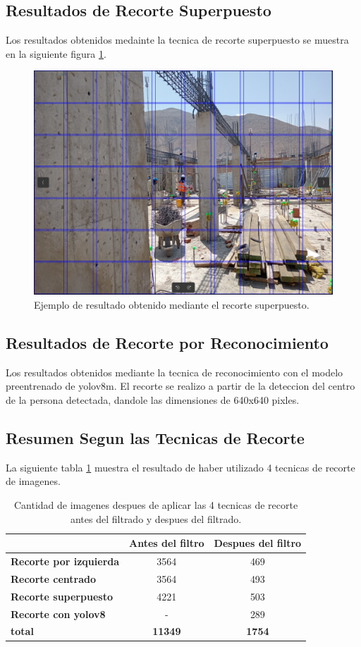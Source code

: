 \subsection{Resultados de Recorte Superpuesto}

Los resultados obtenidos medainte la tecnica de recorte superpuesto se muestra en la siguiente figura \ref{fig:full_use}.

\begin{figure}[!ht]
  \centering
  \includegraphics[width=.49\linewidth]{images/full_use.png}
  \caption{Ejemplo de resultado obtenido mediante el recorte superpuesto.}
  \label{fig:full_use}
\end{figure}

\subsection{Resultados de Recorte por Reconocimiento}

Los resultados obtenidos mediante la tecnica de reconocimiento con el modelo preentrenado de yolov8m. El recorte se realizo a partir de la deteccion del centro de la persona detectada, dandole las dimensiones de 640x640 pixles.

\subsection{Resumen Segun las Tecnicas de Recorte}

La siguiente tabla \ref{tab:summary_table} muestra el resultado de haber utilizado 4 tecnicas de recorte de imagenes.

\begin{table}[ht]
  \centering
  \begin{tabular}{|l|c|c|}
      \hline
       & \textbf{Antes del filtro}  & \textbf{Despues del filtro}\\ \hline
      \textbf{Recorte por izquierda} & 3564 & 469 \\ \hline
      \textbf{Recorte centrado} & 3564 & 493 \\ \hline
      \textbf{Recorte superpuesto} & 4221 & 503 \\ \hline
      \textbf{Recorte con yolov8} & - & 289 \\ \hline
      \textbf{total} & \textbf{11349} & \textbf{1754} \\ \hline
  \end{tabular}
  \caption{Cantidad de imagenes despues de aplicar las 4 tecnicas de recorte antes del filtrado y despues del filtrado.}
  \label{tab:summary_table}
\end{table}


